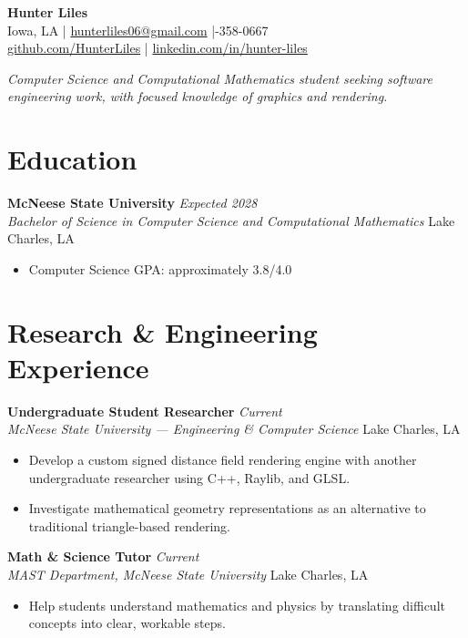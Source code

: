 \documentclass[10pt,letterpaper]{article}
\newcommand{\entry}[4]{
  \textbf{#1} \hfill \textit{#2}\\
  \textit{#3} \hfill #4\\[1.5pt]
}
\begin{document}
\begin{center}
  {\LARGE\bfseries Hunter Liles}\\[3pt]
  Iowa, LA \enspace|\enspace
  \href{mailto:hunterliles06@gmail.com}{hunterliles06@gmail.com} \enspace|-358-0667\\
  \href{https://github.com/HunterLiles}{github.com/HunterLiles} \enspace|\enspace
  \href{https://www.linkedin.com/in/hunter-liles/}{linkedin.com/in/hunter-liles}
\end{center}

\vspace{-1pt}
\begin{center}
  \textit{Computer Science and Computational Mathematics student seeking software engineering work, with focused knowledge of graphics and rendering.}
\end{center}

\section{Education}
\entry{McNeese State University}{Expected 2028}{Bachelor of Science in Computer Science and Computational Mathematics}{Lake Charles, LA}
\begin{itemize}
  \item Computer Science GPA: approximately 3.8/4.0
\end{itemize}

\section{Research \& Engineering Experience}
\entry{Undergraduate Student Researcher}{Current}{McNeese State University --- Engineering \& Computer Science}{Lake Charles, LA}
\begin{itemize}
  \item Develop a custom signed distance field rendering engine with another undergraduate researcher using C++, Raylib, and GLSL.
  \item Investigate mathematical geometry representations as an alternative to traditional triangle-based rendering.
\end{itemize}

\entry{Math \& Science Tutor}{Current}{MAST Department, McNeese State University}{Lake Charles, LA}
\begin{itemize}
  \item Help students understand mathematics and physics by translating difficult concepts into clear, workable steps.
\end{itemize}
\end{document}
